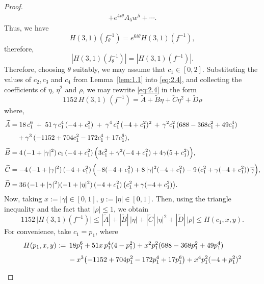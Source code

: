 \documentclass[10pt,a4paper]{amsart}
\begin{document}
\begin{proof}
\begin{align*}
		+e^{4i\theta}A_{5}w^{5}+\cdots .
		\end{align*}
		Thus, we have 
		\[
		H(3,1)(f_{\theta}^{-1})=e^{6i\theta}H(3,1)(f^{-1}),
		\]
	 therefore, 
		\[
		|H(3,1)(f_{\theta}^{-1})|=|H(3,1)(f^{-1})|.
		\]
		Therefore, choosing $\theta$ suitably, we may assume that $c_{1}\in[0,2]$. Substituting the values of $c_2,c_3$ and $c_4$
		from Lemma~\ref{lem:1.1} into \eqref{eq:2.4}, and collecting
		the coefficients of $\eta$, $\eta^2$ and $\rho$, we may rewrite \eqref{eq:2.4} in the form
		\begin{equation}\label{eq:2.5}
			1152\, H(3, 1)\,(f^{-1})=\widetilde{A}+ \widetilde{B} \eta + \widetilde{C} \eta^2+ \widetilde{D}\rho
		\end{equation}
		where,
		\begin{align*}
			\widetilde{A}&=18\,c_{1}^{6}
			\;+\;
			51\,\gamma\,c_{1}^{4}\,(-4 + c_{1}^{2})
			\;+\;
			\gamma^{4}\,c_{1}^{2}\,(-4 + c_{1}^{2})^{2}
			\,+\,
			\gamma^{2}c_{1}^{2}\,(688 - 368c_{1}^{2} + 49c_{1}^{4})
			\;\\[3pt]
			&\quad+\gamma^{3}\,(-1152 + 704c_{1}^{2} - 172c_{1}^{4} + 17c_{1}^{6}), \\[3pt]
			\widetilde{B}&=4\,(-1 + |\gamma|^{2})\,c_{1}\,(-4 + c_{1}^{2})\,
			\Big( 3c_{1}^{2} + \gamma^{2}(-4 + c_{1}^{2}) + 4\gamma(5 + c_{1}^{2}) \Big),\\[3pt]
			\widetilde{C}&=-4\,(-1 + |\gamma|^{2})\,(-4 + c_{1}^{2})\,
			\Bigl(
			-8(-4 + c_{1}^{2})
			+ 8\,|\gamma|^{2}(-4 + c_{1}^{2})
			- 9\,(c_{1}^{2} + \gamma(-4 + c_{1}^{2}))\,\overline{\gamma}
			\Bigr),\\[2pt]
			\widetilde{D}&=36\,(-1 + |\gamma|^{2})(-1 + |\eta|^{2})\,(-4 + c_{1}^{2})\,
			\bigl(c_{1}^{2} + \gamma(-4 + c_{1}^{2})\bigr).
		\end{align*}
		Now, taking
		$
		x:=|\gamma|\in[0,1],\, y:=|\eta|\in[0,1].
		$
		Then, using the triangle inequality and the fact that $|\rho|\le 1$, we obtain
		\[
		1152\,\bigl|H(3,1)(f^{-1})\bigr|
		\le |\widetilde{A}|+|\widetilde{B}|\,|\eta|+|\widetilde{C}|\,|\eta|^{2}+|\widetilde{D}|\,|\rho|
		\le H(c_{1},x,y).
		\]
		For convenience, take $c_{1}=p_{1}$, where
		\begin{align}\label{eq:2.6}
			H(p_{1}, x, y) :=\;
			&\,18 p_{1}^{6}
			+ 51x\,p_{1}^{4}(4 - p_{1}^{2})
			+ x^{2} p_{1}^{2}(688 - 368 p_{1}^{2} + 49 p_{1}^{4}) \notag\\[4pt]
			& - x^{3}\!\left(-1152 + 704 p_{1}^{2} - 172 p_{1}^{4} + 17 p_{1}^{6}\right)
			+ x^{4} p_{1}^{2}(-4 + p_{1}^{2})^{2} \notag\\[4pt]

\end{align}
\end{proof}
\end{document}
